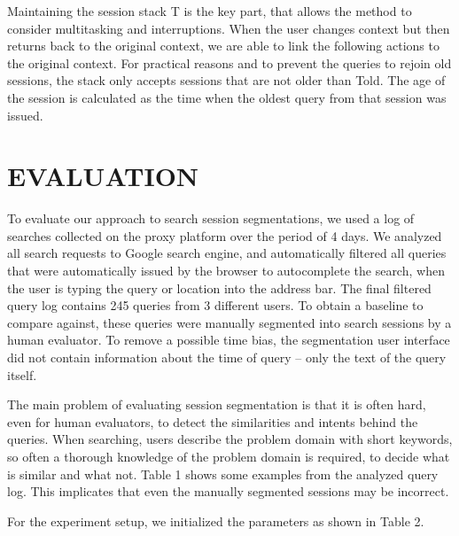 \documentclass{acm_proc_article-sp} %
\begin{document}
Maintaining the session stack T is the key part, that allows
the method to consider multitasking and interruptions.
When the user changes context but then returns back to the
original context, we are able to link the following actions to
the original context. For practical reasons and to prevent
the queries to rejoin old sessions, the stack only accepts sessions
that are not older than Told. The age of the session
is calculated as the time when the oldest query from that
session was issued.

\section{EVALUATION}

To evaluate our approach to search session segmentations,
we used a log of searches collected on the proxy platform
over the period of 4 days. We analyzed all search requests to
Google search engine, and automatically filtered all queries
that were automatically issued by the browser to autocomplete
the search, when the user is typing the query or location
into the address bar. The final filtered query log contains
245 queries from 3 different users. To obtain a baseline
to compare against, these queries were manually segmented
into search sessions by a human evaluator. To remove a
possible time bias, the segmentation user interface did not
contain information about the time of query – only the text
of the query itself.

The main problem of evaluating session segmentation is that
it is often hard, even for human evaluators, to detect the
similarities and intents behind the queries. When searching,
users describe the problem domain with short keywords, so
often a thorough knowledge of the problem domain is required,
to decide what is similar and what not. Table 1
shows some examples from the analyzed query log. This implicates
that even the manually segmented sessions may be
incorrect.

For the experiment setup, we initialized the parameters as
shown in Table 2.
\end{document}
